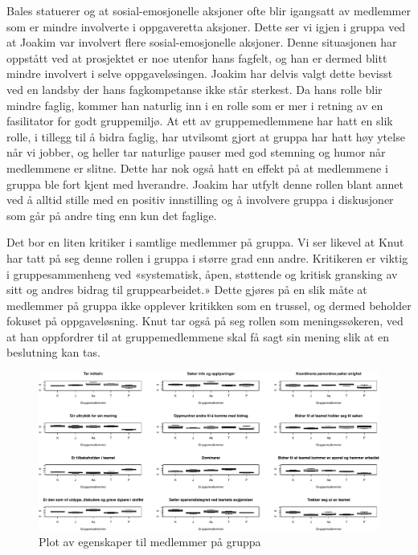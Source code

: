Bales statuerer og at sosial-emosjonelle aksjoner ofte blir igangsatt av medlemmer som er 
mindre involverte i oppgaveretta aksjoner. Dette ser vi igjen i gruppa ved at Joakim var 
involvert flere sosial-emosjonelle aksjoner. Denne situasjonen har oppstått ved at prosjektet 
er noe utenfor hans fagfelt, og han er dermed blitt mindre involvert i selve oppgaveløsingen. 
Joakim har delvis valgt dette bevisst ved en landsby der hans fagkompetanse ikke
står sterkest. Da hans rolle blir mindre faglig, kommer han naturlig inn i en
rolle som er mer i retning av en fasilitator for godt gruppemiljø. At ett av
gruppemedlemmene har hatt en slik rolle, i tillegg til å bidra faglig, har
utvilsomt gjort at gruppa har hatt høy ytelse når vi jobber, og heller tar
naturlige pauser med god stemning og humor når medlemmene er slitne. Dette har
nok også hatt en effekt på at medlemmene i gruppa ble fort kjent med hverandre.
Joakim har utfylt denne rollen blant annet ved å alltid stille med en positiv innstilling og 
å involvere gruppa i diskusjoner som går på andre ting enn kun det faglige.

Det bor en liten kritiker i samtlige medlemmer på gruppa. Vi ser likevel at Knut har tatt på 
seg denne rollen i gruppa i større grad enn andre. Kritikeren er viktig i gruppesammenheng 
ved «systematisk, åpen, støttende og kritisk gransking av sitt og andres bidrag til gruppearbeidet.»
Dette gjøres på en slik måte at medlemmer på gruppa ikke opplever kritikken som en trussel, 
og dermed beholder fokuset på oppgaveløsning. Knut tar også på seg rollen som meningssøkeren, 
ved at han oppfordrer til at gruppemedlemmene skal få sagt sin mening slik at en beslutning
kan tas.

\begin{figure}[ht!]
\centering
\includegraphics[scale=0.4]{teammedlem.pdf}
\caption{Plot av egenskaper til medlemmer på gruppa}
\label{fig:medlemmer}
\end{figure}

